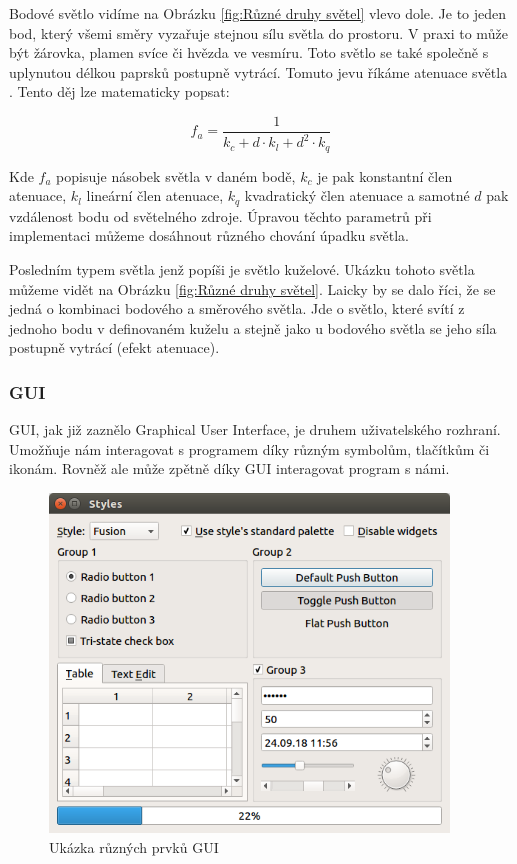 \documentclass[12pt]{article}
\begin{document}
Bodové světlo vidíme na Obrázku \ref{fig:Různé druhy světel} vlevo dole. Je to jeden bod, který všemi směry vyzařuje stejnou sílu světla do prostoru. V praxi to může být žárovka, plamen svíce či hvězda ve vesmíru. Toto světlo se také společně s uplynutou délkou paprsků postupně vytrácí. Tomuto jevu říkáme atenuace světla \cite{attenuation}. Tento děj lze matematicky popsat:

\[f_a = \frac{1}{k_c + d \cdot k_l + d^2 \cdot k_q}\]

Kde $f_a$ popisuje násobek světla v daném bodě, $k_c$ je pak konstantní člen atenuace, $k_l$ lineární člen atenuace, $k_q$ kvadratický člen atenuace a samotné $d$ pak vzdálenost bodu od světelného zdroje. Úpravou těchto parametrů při implementaci můžeme dosáhnout různého chování úpadku světla.

Posledním typem světla jenž popíši je světlo kuželové. Ukázku tohoto světla můžeme vidět na Obrázku \ref{fig:Různé druhy světel}. Laicky by se dalo říci, že se jedná o kombinaci bodového a směrového světla. Jde  o světlo, které svítí z jednoho bodu v definovaném kuželu a stejně jako u bodového světla se jeho síla postupně vytrácí (efekt atenuace). \cite{spotlight}

\subsubsection{GUI}

GUI, jak již zaznělo Graphical User Interface, je druhem uživatelského rozhraní. Umožňuje nám interagovat s programem díky různým symbolům, tlačítkům či ikonám. Rovněž ale může zpětně díky GUI interagovat program s námi. \cite{gui2}

\vspace{0.5cm}
\begin{figure}[h]
    \centering
    \includegraphics[height=9cm]{images/gui.png}
    \caption[Ukázka různých prvků GUI]{Ukázka různých prvků GUI \cite{gui_img}}
    \label{fig:Ukázka různých prvků GUI}
\end{figure}
\end{document}
